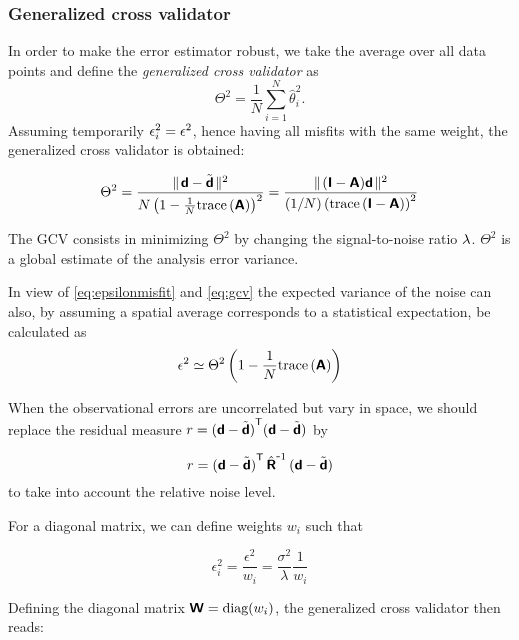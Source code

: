 \subsubsection{Generalized cross validator}

In order to make the error estimator robust, we take the average over all data points and define the \textit{generalized cross validator} as 
\[
\Theta^{2}=\frac{1}{N}\sum_{i=1}^{N}\hat{\theta}_i^2.
\] 
Assuming temporarily $\epsilon_{i}^{2} = \epsilon^{2}$, hence having all misfits with the same weight, the generalized cross validator is obtained:

\begin{equation}
\Theta^2=\frac{\parallel \! \mbox{\boldmath $ \protect\mathsf{d} $}-\tilde{\mbox{\boldmath $ \protect\mathsf{d} $}} \! \parallel^2}{N \left(1- \frac{1}{N}\mathrm{trace}\left( \mbox{\boldmath $ \protect\mathsf{A} $} \right)\right)^2} 
        =\frac{\parallel \! (\mbox{\boldmath $ \protect\mathsf{I} $}-\mbox{\boldmath $ \protect\mathsf{A} $})\mbox{\boldmath $ \protect\mathsf{d} $} \! \parallel^2}{(1/N)\left(\mathrm{trace}\left( \mbox{\boldmath $ \protect\mathsf{I} $}-\mbox{\boldmath $ \protect\mathsf{A} $} \right)\right)^2}
\label{eq:gcv}
\end{equation}

The GCV consists in minimizing $\Theta^{2}$ by changing the signal-to-noise ratio $\lambda$. $\Theta^2$ is a global estimate of the analysis error variance.

In view of \eqref{eq:epsilonmisfit} and \eqref{eq:gcv} the expected variance of the noise can also, by assuming a spatial average corresponds to a statistical expectation, be calculated as 
\begin{equation}
\epsilon^2 \simeq 
{\Theta^2  \left(1 - \frac{1}{N}\mathrm{trace}\left(  \mbox{\boldmath $ \protect\mathsf{A} $}  \right)\right) }
\label{eq:noiseestimate}
\end{equation}



When the observational errors are uncorrelated but vary in space, we should replace the residual measure $r = {(\mbox{\boldmath $ \protect\mathsf{d} $}-\tilde{\mbox{\boldmath $ \protect\mathsf{d} $}})}^\mathsf{T} (\mbox{\boldmath $ \protect\mathsf{d} $}-\tilde{\mbox{\boldmath $ \protect\mathsf{d} $}}) $ by 

\begin{equation}
r = {(\mbox{\boldmath $ \protect\mathsf{d} $}-\tilde{\mbox{\boldmath $ \protect\mathsf{d} $}})}^\mathsf{T} \,{ \hat{\mbox{\boldmath $ \protect\mathsf{R} $}}}^{ \mbox{\small{-}} 1} \,(\mbox{\boldmath $ \protect\mathsf{d} $}-\tilde{\mbox{\boldmath $ \protect\mathsf{d} $}})
\end{equation}
to take into account the relative noise level.


For a diagonal matrix, we can define weights $w_i$ such that

\begin{equation}
\epsilon^2_i = \frac{\epsilon^2}{w_i}= \frac{\sigma^2}{\lambda}\frac{1}{w_i}
\end{equation}

Defining the diagonal matrix $\mbox{\boldmath $ \protect\mathsf{W} $} = \mbox{diag}(w_i)$, the generalized cross validator then reads:

